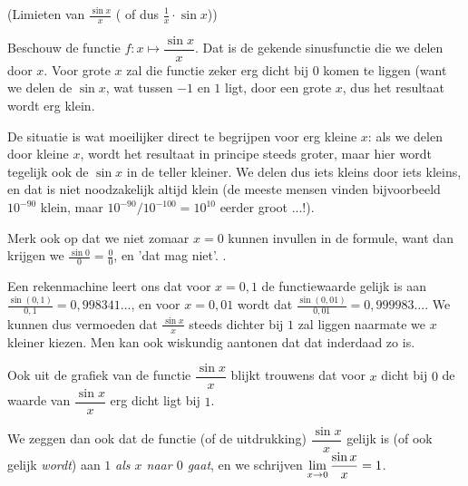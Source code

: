 \documentclass{ximera}
\begin{document}

\begin{example} (Limieten van $\frac{\sin x}{x}$ ( of dus $\frac 1x \cdot\sin x$))
	
Beschouw de functie $f:x\mapsto \dfrac{\sin x}{x}$. Dat is de gekende sinusfunctie die we delen door $x$. Voor grote $x$ zal die functie zeker erg dicht bij $0$ komen te liggen (want we delen de $\sin x$, wat tussen $-1$ en $1$ ligt, door een grote $x$, dus het resultaat wordt erg klein. 

De situatie is wat moeilijker direct te begrijpen voor erg kleine $x$: als we delen door kleine $x$, wordt het resultaat in principe steeds groter, maar hier wordt tegelijk ook de $\sin x$ in de teller kleiner. We delen dus iets kleins door iets kleins, en dat is niet noodzakelijk altijd klein (de meeste mensen vinden bijvoorbeeld $10^{-90}$ klein, maar $10^{-90}/10^{-100} = 10^{10}$ eerder groot ...!). 

Merk ook op dat we niet zomaar $x=0$ kunnen invullen in de formule, want dan krijgen we $\frac{\sin 0}{0} = \frac{0}{0}$, en 'dat mag niet'. 
. 

Een rekenmachine leert ons dat voor $x=0,1$ de functiewaarde gelijk is aan $\frac{\sin(0,1)}{0,1}=0,998341\dots$, en voor  $x=0,01$ wordt dat $\frac{\sin(0,01)}{0,01}=0,999983\dots$. We  kunnen dus vermoeden dat $\frac{\sin x}{x}$ steeds dichter bij $1$ zal liggen naarmate we $x$ kleiner kiezen. Men kan ook wiskundig aantonen dat dat inderdaad zo is.

Ook uit de grafiek van de functie  $\dfrac{\sin x}{x}$ blijkt trouwens dat voor $x$ dicht bij $0$ de waarde van $\dfrac{\sin x}{x}$ erg dicht ligt bij $1$. 

We zeggen dan ook dat de functie (of de uitdrukking) $\dfrac{\sin x}{x}$ gelijk is (of ook gelijk \textit{wordt}) aan $1$ \textit{als $x$ naar $0$ gaat}, en we schrijven $\limx \dfrac{\sin x}{x} = 1$.


\end{example}
\end{document}

